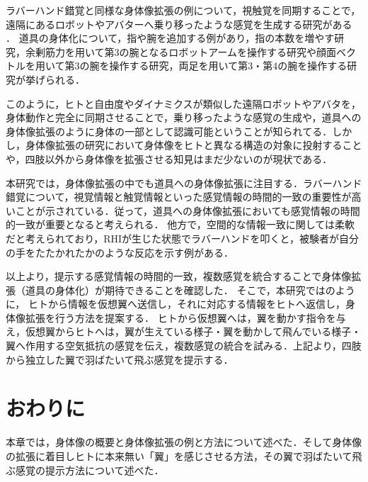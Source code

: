     ラバーハンド錯覚と同様な身体像拡張の例について，視触覚を同期することで，遠隔にあるロボットやアバターへ乗り移ったような感覚を生成する研究がある
    \cite{tachi2015telexistence}\cite{ehrsson2004s}\cite{slater2008towards}\cite{iwasaki2017research}\cite{petkova2008if}．
    道具の身体化について，指や腕を追加する例があり，指の本数を増やす研究\cite{prattichizzo2014sixth}，余剰筋力を用いて第3の腕となるロボットアームを操作する研究\cite{iwadare2017thirdarm}\cite{岩垂真哉2016余剰筋力を用いた第三の腕ロボットの操縦}や顔面ベクトルを用いて第3の腕を操作する研究\cite{iwasaki2017research}，両足を用いて第3・第4の腕を操作する研究が挙げられる\cite{sasaki2017metalimbs}．
    
    このように，ヒトと自由度やダイナミクスが類似した遠隔ロボットやアバタを，身体動作と完全に同期させることで，乗り移ったような感覚の生成や，道具への身体像拡張のように身体の一部として認識可能ということが知られてる．しかし，身体像拡張の研究において身体像をヒトと異なる構造の対象に投射することや，四肢以外から身体像を拡張させる知見はまだ少ないのが現状である．

    
    本研究では，身体像拡張の中でも道具への身体像拡張に注目する．ラバーハンド錯覚について，視覚情報と触覚情報といった感覚情報の時間的一致の重要性が高いことが示されている\cite{本間元康2010ラバーハンドイリュージョン}\cite{ehrsson2007experimental}\cite{shimada2009rubber}．従って，道具への身体像拡張においても感覚情報の時間的一致が重要となると考えられる．
    他方で，空間的な情報一致に関しては柔軟だと考えられており，RHIが生じた状態でラバーハンドを叩くと，被験者が自分の手をたたかれたかのような反応を示す例がある\cite{armel2003projecting}．


    以上より，提示する感覚情報の時間的一致，複数感覚を統合することで身体像拡張（道具の身体化）が期待できることを確認した．
    そこで，本研究ではのように，
    ヒトから情報を仮想翼へ送信し，それに対応する情報をヒトへ返信し，身体像拡張を行う方法を提案する．
    ヒトから仮想翼へは，翼を動かす指令を与え，仮想翼からヒトへは，翼が生えている様子・翼を動かして飛んでいる様子・翼へ作用する空気抵抗の感覚を伝え，複数感覚の統合を試みる．上記より，四肢から独立した翼で羽ばたいて飛ぶ感覚を提示する．

\section{おわりに}
    本章では，身体像の概要と身体像拡張の例と方法について述べた．そして身体像の拡張に着目しヒトに本来無い「翼」を感じさせる方法，その翼で羽ばたいて飛ぶ感覚の提示方法について述べた．
    
